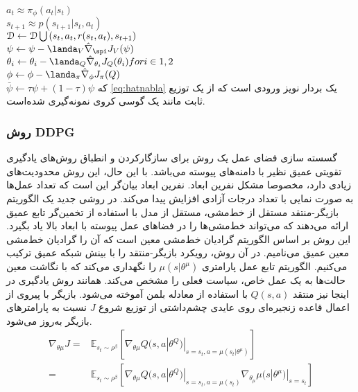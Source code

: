 $a_t \approx \pi_\phi(a_t|s_t)$ \\
$s_{t+1} \approx p(s_{t+1}|s_t,a_t)$\\
$\EuScript{D}\leftarrow \EuScript{D} \bigcup {(s_t,a_t,r(s_t,a_t),s_{t+1})}$ \\
$\psi \leftarrow \psi - \landa_V \hat{\nabla}_\spi J_V (\psi)$ \\
$\theta_i \leftarrow \theta_i - \landa_Q \hat{\nabla}_{\theta_i} J_Q(\theta_i) for i \in {1,2}$\\
$\phi \leftarrow \phi - \landa_\pi \hat{\nabla}_\phi J_\pi (Q)$ \\
$\bar{\psi} \leftarrow \tau \psi + (1-\tau) \psi$
که \ref{eq:hatnabla} یک بردار نویز ورودی است که از یک توزیع ثابت مانند یک گوسی کروی نمونه‌گیری شده‌است.
\subsubsection{روش DDPG}
گسسته سازی فضای عمل یک روش برای سازگار‌کردن و انطباق روش‌های یادگیری تقویتی عمیق نظیر 
با دامنه‌های پیوسته می‌باشد. با این حال، این روش محدودیت‌های زیادی دارد، مخصوصا مشکل نفرین ابعاد. نفرین ابعاد بیان‌گر این است که تعداد عمل‌ها به صورت نمایی با تعداد درجات آزادی افزایش پیدا می‌کند. 
در روشی جدید یک الگوریتم بازیگر-منتقد مستقل از خط‌مشی، مستقل از مدل
با استفاده از تخمین‌گر تابع عمیق ارائه می‌دهند که می‌تواند خط‌مشی‌ها را در فضاهای عمل پیوسته با ابعاد بالا یاد بگیرد.
این روش بر اساس الگوریتم گرادیان خط‌مشی معین
است که آن را گرادیان خط‌مشی معین عمیق
می‌نامیم. 
در آن روش، رویکرد بازیگر-منتقد را با بینش شبکه  عمیق
ترکیب می‌کنیم.
الگوریتم 
تابع عمل پارامتری
$
\mu (s|\theta^\mu)	
$
را نگهداری می‌کند که با نگاشت معین حالت‌ها به یک عمل خاص، سیاست فعلی را مشخص می‌کند.
همانند روش یادگیری 
در اینجا نیز منتقد
$Q(s,a)$
با استفاده از معادله بلمن آموخته می‌شود.
بازیگر با پیروی از اعمال قاعده زنجیره‌ای روی عایدی چشم‌داشتی از توزیع شروع
$J$
نسبت به پارامترهای بازیگر به‌روز می‌شود.
\begin{align}
	\nabla_{\theta \mu} J = & \mathbb{E}_{s_t \sim \rho ^{ \beta}} [ \nabla_{\theta \mu} Q(s,a|\theta^Q)|_{s=s_t,a=\mu (s_t|\theta^{\mu})}  ] \\ \nonumber
	= & \mathbb{E}_{s_t \sim \rho ^{ \beta}} [ \nabla_{\theta \mu} Q(s,a|\theta^Q)|_{s=s_t, a=\mu (s_t)} \nabla_{\theta_{\mu}} \mu (s|\theta^{\mu})|_{s=s_t} ]
\end{align}
